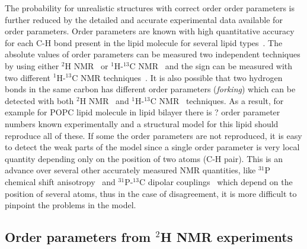 \documentclass[aps,prl,superscriptaddress,twocolumn]{revtex4}
\begin{document}
The probability for unrealistic structures with correct order order parameters is further reduced by
the detailed and accurate experimental data available for order parameters.
Order parameters are known with high quantitative accuracy for each C-H bond present in the lipid molecule
for several lipid types~\cite{??}. The absolute values of order parameters can be measured two independent
techniques by using either $^2$H NMR~\cite{seelig77c} or $^1$H-$^{13}$C NMR~\cite{hong95a,gross97,dvinskikh05a,ferreira13} and
the sign can be measured with two different $^1$H-$^{13}$C NMR techniques~\cite{hong95a,hong95b,gross97}.
It is also possible that two hydrogen bonds in the same carbon has different order parameters ({\it forking})
which can be detected with both $^2$H NMR~\cite{??} and $^1$H-$^{13}$C NMR~\cite{??} techniques.
As a result, for example for POPC lipid molecule in lipid bilayer there is ? order parameter numbers
known experimentally and a structural model for this lipid should reproduce all of these.
If some the order parameters are not reproduced, it is easy to detect the weak parts of the model
since a single order parameter is very local quantity depending only on the position of two atoms (C-H pair).
This is an advance over several other accurately measured NMR quantities, 
like $^{31}$P chemical shift anisotropy~\cite{chowdhary13} and $^{31}$P-$^{13}$C dipolar couplings~\cite{prakash10}
which depend on the position of several atoms, thus in the case of disagreement, it is more difficult 
to pinpoint the problems in the model.








 

\subsection{Order parameters from $^2$H NMR experiments}
\end{document}
